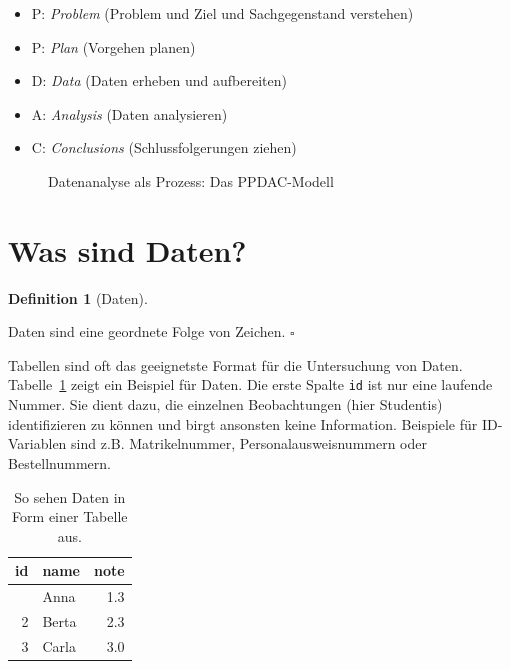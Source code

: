 \documentclass[
  letterpaper,
  twoside,
  open=any]{scrbook}
\providecommand{\tightlist}{%
  \setlength{\itemsep}{0pt}\setlength{\parskip}{0pt}}\usepackage{longtable,booktabs,array}
\theoremstyle{definition}
\newtheorem{definition}{Definition}[chapter]
\theoremstyle{definition}
\theoremstyle{definition}
\theoremstyle{remark}
\begin{document}
\begin{itemize}
\tightlist
\item
  P: \emph{Problem} (Problem und Ziel und Sachgegenstand verstehen)
\item
  P: \emph{Plan} (Vorgehen planen)
\item
  D: \emph{Data} (Daten erheben und aufbereiten)
\item
  A: \emph{Analysis} (Daten analysieren)
\item
  C: \emph{Conclusions} (Schlussfolgerungen ziehen)
\end{itemize}

\begin{figure}


\caption{\label{fig-ppdac}Datenanalyse als Prozess: Das PPDAC-Modell}

\end{figure}%

\section{Was sind Daten?}\label{was-sind-daten}

\begin{definition}[Daten]\protect\hypertarget{def-daten}{}\label{def-daten}

Daten sind eine geordnete Folge von Zeichen. \(\square\)

\end{definition}

Tabellen sind oft das geeignetste Format für die Untersuchung von Daten.
Tabelle~\ref{tbl-daten} zeigt ein Beispiel für Daten. Die erste Spalte
\texttt{id} ist nur eine laufende Nummer. Sie dient dazu, die einzelnen
Beobachtungen (hier Studentis) identifizieren zu können und birgt
ansonsten keine Information. Beispiele für ID-Variablen sind z.B.
Matrikelnummer, Personalausweisnummern oder Bestellnummern.

\begin{longtable}[]{@{}rlr@{}}

\caption{\label{tbl-daten}So sehen Daten in Form einer Tabelle aus.}

\tabularnewline

\toprule\noalign{}
id & name & note \\
\midrule\noalign{}
\endhead
\bottomrule\noalign{}
\endlastfoot
1 & Anna & 1.3 \\
2 & Berta & 2.3 \\
3 & Carla & 3.0 \\

\end{longtable}
\end{document}
